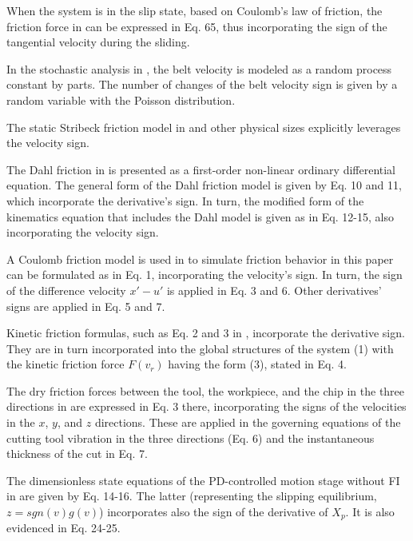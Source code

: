 \documentclass[11pt]{book}
\begin{document}
When the system is in the slip state, based on Coulomb's law of friction,
the friction force in \cite{yuan2016new} can be expressed in Eq.
65, thus incorporating the sign of the tangential velocity during
the sliding.

In the stochastic analysis in \cite{lima2016stochastic}, the belt
velocity is modeled as a random process constant by parts. The number
of changes of the belt velocity sign is given by a random variable
with the Poisson distribution.

The static Stribeck friction model in \cite{ruderman2017break} and
other physical sizes explicitly leverages the velocity sign.

The Dahl friction in \cite{choi2017tension} is presented as a first-order
non-linear ordinary differential equation. The general form of the
Dahl friction model is given by Eq. 10 and 11, which incorporate the
derivative's sign. In turn, the modified form of the kinematics equation
that includes the Dahl model is given as in Eq. 12-15, also incorporating
the velocity sign.

A Coulomb friction model is used in \cite{ismail2017passive} to simulate
friction behavior in this paper can be formulated as in Eq. 1, incorporating
the velocity's sign. In turn, the sign of the difference velocity
$x'-u'$ is applied in Eq. 3 and 6. Other derivatives' signs are applied
in Eq. 5 and 7.

Kinetic friction formulas, such as Eq. 2 and 3 in \cite{chen2018global},
incorporate the derivative sign. They are in turn incorporated into
the global structures of the system (1) with the kinetic friction
force $F\left(v_{r}\right)$ having the form (3), stated in Eq. 4.

The dry friction forces between the tool, the workpiece, and the chip
in the three directions in \cite{wang2018bifurcation} are expressed
in Eq. 3 there, incorporating the signs of the velocities in the $x$,
$y$, and $z$ directions. These are applied in the governing equations
of the cutting tool vibration in the three directions (Eq. 6) and
the instantaneous thickness of the cut in Eq. 7.

The dimensionless state equations of the PD-controlled motion stage
without FI in \cite{dong2019friction} are given by Eq. 14-16. The
latter (representing the slipping equilibrium, $z=sgn\left(v\right)g\left(v\right)$)
incorporates also the sign of the derivative of $X_{p}$. It is also
evidenced in Eq. 24-25.

\end{document}
